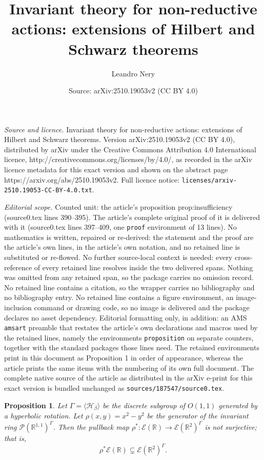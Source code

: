 \documentclass[10pt,a4paper]{amsart}
\title{Invariant theory for non-reductive actions: extensions of Hilbert and Schwarz theorems}
\author{Leandro Nery}
\date{Source: arXiv:2510.19053v2 (CC BY 4.0)}
\newtheorem{proposition}{Proposition}
\begin{document}
\maketitle

\noindent\emph{Source and licence.} Invariant theory for non-reductive actions: extensions of Hilbert and Schwarz theorems. Version arXiv:2510.19053v2 (CC BY 4.0), distributed by arXiv under the Creative Commons Attribution 4.0 International licence, http://creativecommons.org/licenses/by/4.0/, as recorded in the arXiv licence metadata for this exact version and shown on the abstract page https://arxiv.org/abs/2510.19053v2. Full licence notice: \texttt{licenses/arxiv-2510.19053-CC-BY-4.0.txt}.\par\smallskip

\noindent\textit{Editorial scope.} Counted unit: the article's proposition prop:insufficiency (source0.tex lines 390--395). The article's complete original proof of it is delivered with it (source0.tex lines 397--409, one \texttt{proof} environment of 13 lines). No mathematics is written, repaired or re-derived: the statement and the proof are the article's own lines, in the article's own notation, and no retained line is substituted or re-flowed.  No further source-local context is needed: every cross-reference of every retained line resolves inside the two delivered spans.  Nothing was omitted from any retained span, so the package carries no omission record.  No retained line contains a citation, so the wrapper carries no bibliography and no bibliography entry.  No retained line contains a figure environment, an image-inclusion command or drawing code, so no image is delivered and the package declares no asset dependency.  Editorial formatting only, in addition: an AMS \texttt{amsart} preamble that restates the article's own declarations and macros used by the retained lines, namely the environments \texttt{proposition} on separate counters, together with the standard packages those lines need.  The retained environments print in this document as Proposition 1 in order of appearance, whereas the article prints the same items with the numbering of its own full document.  The complete native source of the article as distributed in the arXiv e-print for this exact version is bundled unchanged as \texttt{sources/187547/source0.tex}.
\begin{proposition} \label{prop:insufficiency}
	Let $\Gamma = \langle \mathcal{H}_\beta \rangle$ be the discrete subgroup of $O(1,1)$ generated by a hyperbolic rotation. Let $\rho(x,y) = x^2 - y^2$ be the generator of the invariant ring $\mathcal{P}(\mathbb{R}^{1,1})^\Gamma$. Then the pullback map $\rho^* : \mathcal{E}(\mathbb{R}) \to \mathcal{E}(\mathbb{R}^2)^\Gamma$ is not surjective; that is,
	\[
	\rho^*\mathcal{E}(\mathbb{R}) \subsetneq \mathcal{E}(\mathbb{R}^2)^\Gamma.
	\]
\end{proposition}
\end{document}
